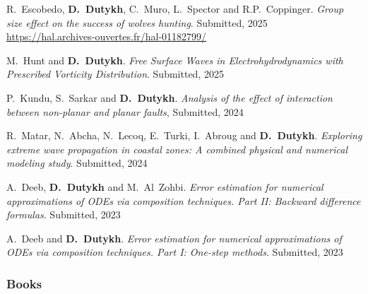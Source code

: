 \documentclass[final, a4paper, oneside, 12pt]{article}
\numberwithin{equation}{section}
\begin{document}
\begin{etaremune}

  \item R.~Escobedo, \textbf{D.~Dutykh}, C.~Muro, L.~Spector and R.P.~Coppinger. \textit{Group size effect on the success of wolves hunting}. Submitted, 2025 \\ %
  \url{https://hal.archives-ouvertes.fr/hal-01182799/}

  \item M.~Hunt and \textbf{D.~Dutykh}. \textit{Free Surface Waves in Electrohydrodynamics with Prescribed Vorticity Distribution}. Submitted, 2025 %

  \item P.~Kundu, S.~Sarkar and \textbf{D.~Dutykh}. \textit{Analysis of the effect of interaction between non-planar and planar faults}, Submitted, 2024 %

  \item R.~Matar, N.~Abcha, N.~Lecoq, E.~Turki, I.~Abroug and \textbf{D.~Dutykh}. \textit{Exploring extreme wave propagation in coastal zones: A combined physical and numerical modeling study}. Submitted, 2024 %

  \item A.~Deeb, \textbf{D.~Dutykh} and M.~Al~Zohbi. \textit{Error estimation for numerical approximations of ODEs via composition techniques. Part II: Backward difference formulas}. Submitted, 2023 %

  \item A.~Deeb and \textbf{D.~Dutykh}. \textit{Error estimation for numerical approximations of ODEs via composition techniques. Part I: One-step methods}. Submitted, 2023 %

\end{etaremune}

\subsubsection{Books}
\end{document}
